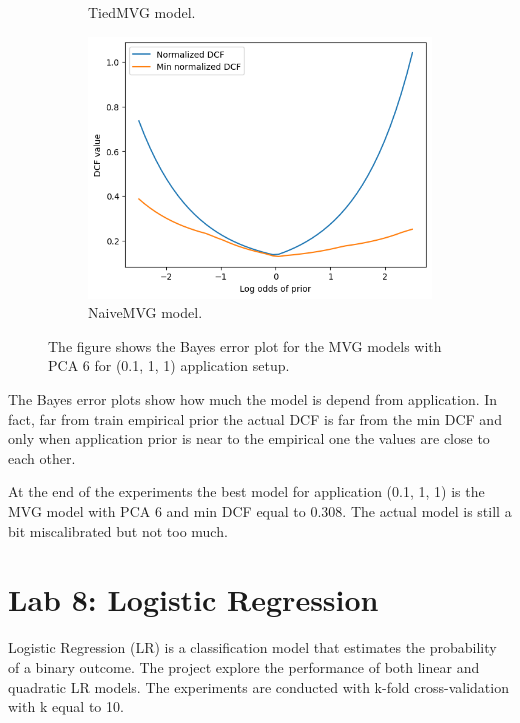 \documentclass{article}
\begin{document}
\begin{figure}[ht]
\begin{subfigure}[b]{0.3\textwidth}
        \caption{TiedMVG model.}
    \end{subfigure}
    \hfill
    \begin{subfigure}[b]{0.3\textwidth}
        \centering
        \includegraphics[width=\textwidth]{images/mvg_bayes_error_naive.png}
        \caption{NaiveMVG model.}
    \end{subfigure}
    \caption{The figure shows the Bayes error plot for the MVG models with PCA 6 for (0.1, 1, 1) application setup.}
    \label{fig:mvg_bayes_error}
\end{figure}

The Bayes error plots show how much the model is depend from application. In fact, far from train empirical prior the actual DCF is far from the min DCF and only when application prior is near to the empirical one the values are close to each other. 

At the end of the experiments the best model for application (0.1, 1, 1) is the MVG model with PCA 6 and min DCF equal to 0.308. The actual model is still a bit miscalibrated but not too much.

\section{Lab 8: Logistic Regression}
\label{sec:logistic_regression}
Logistic Regression (LR) is a classification model that estimates the probability of a binary outcome. The project explore the performance of both linear and quadratic LR models. The experiments are conducted with k-fold cross-validation with k equal to 10. 
\end{document}
